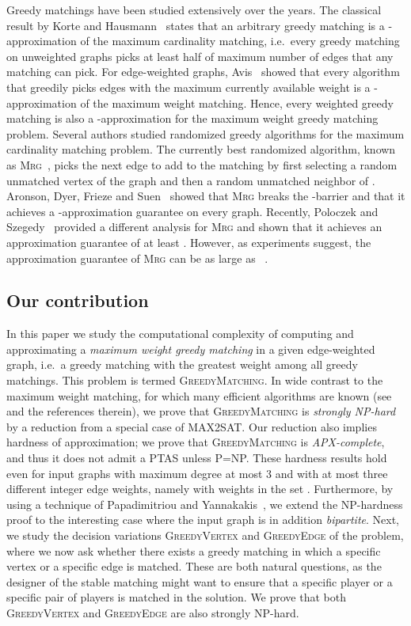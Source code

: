 \documentclass[a4paper,11pt]{article}
\newcommand{\mrg}{\textsc{Mrg}\xspace}
\begin{document}
Greedy matchings have been studied extensively over the years. 
The classical result 
by Korte and Hausmann~\cite{HK78} states that an arbitrary greedy matching is a 
-approximation of the maximum cardinality matching, i.e.~every 
greedy matching on unweighted graphs picks at least half of maximum number of 
edges that any matching can pick. For edge-weighted graphs,
Avis~\cite{Avis83} showed that every algorithm that greedily picks edges with 
the maximum currently available weight is a -approximation of the maximum 
weight matching. Hence, every weighted greedy matching is also a 
-approximation for the maximum weight greedy matching problem. 
Several authors studied randomized greedy algorithms for the maximum cardinality
matching problem. The currently best randomized algorithm, known as \mrg~\cite{ADFS95}, picks the next edge to add to the matching 
by first selecting a random unmatched vertex  of the graph and then a random 
unmatched neighbor of . 
Aronson, Dyer, Frieze and Suen~\cite{ADFS95} showed that \mrg breaks the -barrier 
and that it achieves a -approximation guarantee on every graph. 
Recently, Poloczek and Szegedy~\cite{PS12} provided a different analysis for \mrg
and shown that it achieves an approximation guarantee of at least . However, as experiments suggest, the approximation guarantee of
\mrg can be as large as ~\cite{PS12}.





\subsection{Our contribution}
In this paper we study the computational complexity of computing and
approximating a \emph{maximum weight greedy matching} in a given
edge-weighted graph, i.e.~a greedy matching with the greatest weight among
all greedy matchings. This problem is termed \textsc{GreedyMatching}. In
wide contrast to the maximum weight matching, for which many efficient
algorithms are known (see \cite{Duan14} and the references therein), we prove
that \textsc{GreedyMatching} is \emph{strongly NP-hard} by a reduction from
a special case of MAX2SAT. Our reduction also implies hardness of
approximation; we prove that \textsc{GreedyMatching} is \emph{APX-complete},
and thus it does not admit a PTAS unless P=NP. These hardness results hold
even for input graphs with maximum degree at most 3 and with at most three
different integer edge weights, namely with weights in the set .
Furthermore, by using a technique of Papadimitriou and Yannakakis~\cite{PY91}, we extend the NP-hardness proof to the interesting case where the input
graph is in addition \emph{bipartite}. Next, we study the decision
variations \textsc{GreedyVertex} and \textsc{GreedyEdge} of the problem,
where we now ask whether there exists a greedy matching in which a specific
vertex  or a specific edge  is matched. These are both natural
questions, as the designer of the stable matching might want to ensure
that a specific player or a specific pair of players is matched in the
solution. We prove that both \textsc{GreedyVertex} and \textsc{GreedyEdge}
are also strongly \textsc{NP}-hard.
\end{document}
